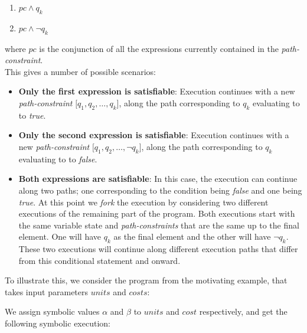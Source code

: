 		\begin{enumerate}
			\item $ pc \land q_k$
			\item $ pc \land \neg q_k$
		\end{enumerate}	
		where $pc$ is the conjunction of all the expressions currently contained in the \emph{path-constraint}.
		\\
		This gives a number of possible scenarios:	
		\begin{itemize}
			\item \textbf{Only the first expression is satisfiable}: Execution continues with a new \emph{path-constraint} $\lbrack q_1, q_2, \ldots, q_k \rbrack$, along the path corresponding to $q_k$ evaluating to to \emph{true}.
			\item \textbf{Only the second expression is satisfiable}:  Execution continues with a new \emph{path-constraint} $\lbrack q_1, q_2, \ldots, \neg q_k \rbrack$, along the path corresponding to $q_k$ evaluating to to \emph{false}.
			
			\item \textbf{Both expressions are satisfiable}: In this case, the execution can continue along two paths; one corresponding to the condition being \emph{false} and one being \emph{true}. At this point we \emph{fork} the execution by considering two different executions of the remaining part of the program. Both executions start with the same variable state and \emph{path-constraints} that are the same
			 up to the final element. One will have $q_k$ as the final element and the other will have $\neg q_k$. 
			These two executions will continue along different execution paths that differ from this conditional statement and onward.
		\end{itemize}
		
		To illustrate this, we consider the program from the motivating example, that takes input parameters $units$ and $costs$:
		
		\motexample{}
		
		We assign symbolic values $\alpha$ and $\beta$ to $units$ and $cost$ respectively, and get the following symbolic execution:
		
